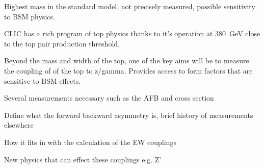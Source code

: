 Highest mass in the standard model, not precisely measured, possible sensitivity to BSM physics.

CLIC has a rich program of top physics thanks to it's operation at 380~GeV close to the top pair production threshold.

Beyond the mass and width of the top, one of the key aims will be to measure the coupling of of the top to z/gamma. Provides access to form factors that are sensitive to BSM effects.

Several measurements necessary such as the AFB and cross section

Define what the forward backward asymmetry is, brief history of measurements elsewhere

How it fits in with the calculation of the EW couplings

New physics that can effect these couplings e.g. Z'

